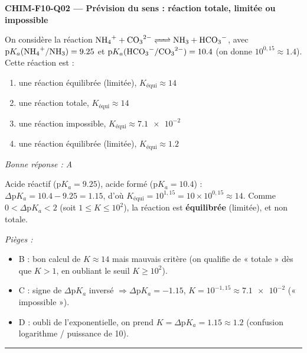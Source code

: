 \documentclass[11pt,a4paper]{article}
\begin{document}
\noindent\textbf{CHIM-F10-Q02 --- Prévision du sens : réaction totale, limitée ou impossible}\par
On considère la réaction $\ce{NH4+ + CO3^{2-} <=> NH3 + HCO3-}$, avec $\mathrm{p}K_a(\ce{NH4+}/\ce{NH3}) = \num{9.25}$ et $\mathrm{p}K_a(\ce{HCO3-}/\ce{CO3^{2-}}) = \num{10.4}$ (on donne $10^{0{,}15} \approx \num{1.4}$). Cette réaction est :
\begin{enumerate}[label=\Alph*)]
\item une réaction équilibrée (limitée), $K_{\text{équi}} \approx \num{14}$
\item une réaction totale, $K_{\text{équi}} \approx \num{14}$
\item une réaction impossible, $K_{\text{équi}} \approx \num{7.1e-2}$
\item une réaction équilibrée (limitée), $K_{\text{équi}} \approx \num{1.2}$
\end{enumerate}
\textit{Bonne réponse : A}\par
Acide réactif  ($\mathrm{p}K_a = \num{9.25}$), acide formé  ($\mathrm{p}K_a = \num{10.4}$) : $\Delta\mathrm{p}K_a = \num{10.4} - \num{9.25} = \num{1.15}$, d'où $K_{\text{équi}} = 10^{1{,}15} = 10 \times 10^{0{,}15} \approx \num{14}$. Comme $0 < \Delta\mathrm{p}K_a < 2$ (soit $1 \le K \le 10^{2}$), la réaction est \textbf{équilibrée} (limitée), et non totale.\par
\textit{Pièges :}
\begin{itemize}
\item B : bon calcul de $K \approx \num{14}$ mais mauvais critère (on qualifie de « totale » dès que $K > 1$, en oubliant le seuil $K \ge 10^{2}$).
\item C : signe de $\Delta\mathrm{p}K_a$ inversé $\Rightarrow \Delta\mathrm{p}K_a = \num{-1.15}$, $K = 10^{-1{,}15} \approx \num{7.1e-2}$ (« impossible »).
\item D : oubli de l'exponentielle, on prend $K = \Delta\mathrm{p}K_a = \num{1.15} \approx \num{1.2}$ (confusion logarithme / puissance de 10).
\end{itemize}
\vspace{6pt}\hrule\vspace{8pt}
\end{document}

